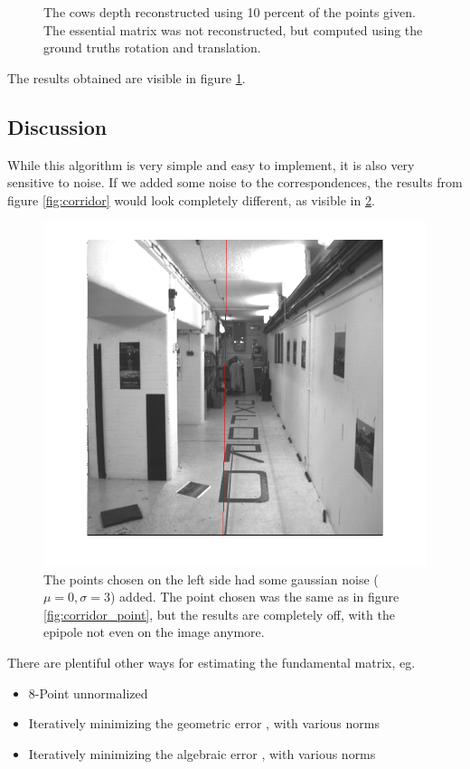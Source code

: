 \documentclass{paper}
\begin{document}
\begin{figure}
\begin{subfigure}{0.3\textwidth}
\end{subfigure}
\caption{The cows depth reconstructed using 10 percent of the points given.
The essential matrix was not reconstructed, but computed using the ground
truths rotation and translation.}
\label{fig:cow}
\end{figure}
The results obtained are visible in figure \ref{fig:cow}.
\subsection{Discussion}
While this algorithm is very simple and easy to implement, it is also very sensitive
to noise. If we added some noise to the correspondences, the results from figure \ref{fig:corridor} would look completely different, as visible in \ref{fig:corridor_noisy}.
\begin{figure}[h]
\centering
   \includegraphics[width=\textwidth]{corridor_eline_noisy}
\caption{The points chosen on the left side had some gaussian noise 
($\mu = 0, \sigma = 3$) added. The point chosen was the same as in figure 
\ref{fig:corridor_point},
 but the results are completely off, with the epipole not even
on the image anymore.}
\label{fig:corridor_noisy}
\end{figure}
 There are plentiful other ways for estimating the fundamental matrix, eg.
\begin{itemize}
\item 8-Point unnormalized
\item Iteratively minimizing the geometric error \cite{Hartley2004}, with various norms
\item Iteratively minimizing the algebraic error \cite{Hartley2004}, with various norms
\end{itemize}
\end{document}

